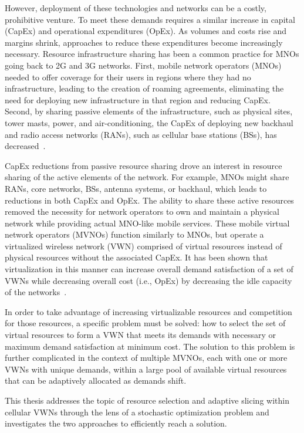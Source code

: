 \documentclass[12pt,dvipsnames]{report}
\begin{document}
However, deployment of these technologies and networks can be a costly, prohibitive venture.  To meet these demands requires a similar increase in capital (CapEx) and operational expenditures (OpEx).  As volumes and costs rise and margins shrink, approaches to reduce these expenditures become increasingly necessary.  Resource infrastructure sharing has been a common practice for MNOs going back to 2G and 3G networks.  First, mobile network operators (MNOs) needed to offer coverage for their users in regions where they had no infrastructure, leading to the creation of roaming agreements, eliminating the need for deploying new infrastructure in that region and reducing CapEx.  Second, by sharing passive elements of the infrastructure, such as physical sites, tower masts, power, and air-conditioning, the CapEx of deploying new backhaul and radio access networks (RANs), such as cellular base stations (BSs), has decreased~\cite{1421931}.

CapEx reductions from passive resource sharing drove an interest in resource sharing of the active elements of the network.  For example, MNOs might share RANs, core networks, BSs, antenna systems, or backhaul, which leads to reductions in both CapEx and OpEx.  The ability to share these active resources removed the necessity for network operators to own and maintain a physical network while providing actual MNO-like mobile services.  These mobile virtual network operators (MVNOs) function similarly to MNOs, but operate a virtualized wireless network (VWN) comprised of virtual resources instead of physical resources without the associated CapEx.  It has been shown that virtualization in this manner can increase overall demand satisfaction of a set of VWNs while decreasing overall cost (i.e., OpEx) by decreasing the idle capacity of the networks~\cite{MJ_CCNC_16}.

In order to take advantage of increasing virtualizable resources and competition for those resources, a specific problem must be solved: how to select the set of virtual resources to form a VWN that meets its demands with necessary or maximum demand satisfaction at minimum cost.  The solution to this problem is further complicated in the context of multiple MVNOs, each with one or more VWNs with unique demands, within a large pool of available virtual resources that can be adaptively allocated as demands shift.

This thesis addresses the topic of resource selection and adaptive slicing within cellular VWNs through the lens of a stochastic optimization problem and investigates the two approaches to efficiently reach a solution.
\end{document}
